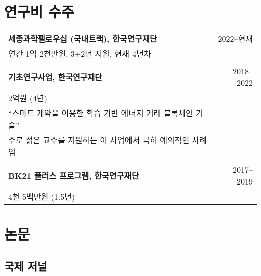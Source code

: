 \documentclass[11pt,a4paper]{article}
\begin{document}
\section{연구비 수주}

\begin{tabular}{p{14cm}r}
\textbf{세종과학펠로우십 (국내트랙), 한국연구재단} & 2022--현재 \\
연간 1억 2천만원, 3+2년 지원, 현재 4년차 & \\
\\
\textbf{기초연구사업, 한국연구재단} & 2018--2022 \\
2억원 (4년) & \\
``스마트 계약을 이용한 학습 기반 에너지 거래 블록체인 기술'' & \\
주로 젊은 교수를 지원하는 이 사업에서 극히 예외적인 사례임 & \\
\\
\textbf{BK21 플러스 프로그램, 한국연구재단} & 2017--2019 \\
4천 5백만원 (1.5년) & \\
\end{tabular}

\section{논문}

\subsection{국제 저널}
\end{document}
